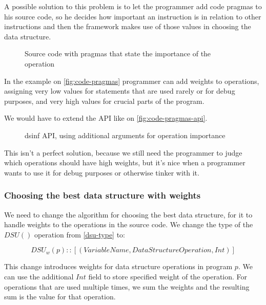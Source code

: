 \documentclass[a4paper,11pt]{article}
\begin{document}
			A possible solution to this problem is to let the programmer add code pragmas to his source
			code, so he decides how important an instruction is in relation to other instructions and then
			the framework makes use of those values in choosing the data structure.

            \begin{figure}[!h]
				

				\caption{Source code with pragmas that state the importance of the operation}

				\label{fig:code-pragmas}
			\end{figure}

            In the example on \autoref{fig:code-pragmas} programmer can add weights to operations, assigning very low values
			for statements that are used rarely or for debug purposes, and very high values for crucial
			parts of the program.

            We would have to extend the API like on \autoref{fig:code-pragmas-api}.

            \begin{figure}[!h]
				

				\caption{dsinf API, using additional arguments for operation importance}

				\label{fig:code-pragmas-api}
			\end{figure}

			This isn't a perfect solution, because we still need the programmer to judge which operations
			should have high weights, but it's nice when a programmer wants to use it for debug purposes or
			otherwise tinker with it.

		\subsubsection{Choosing the best data structure with weights} \label{sec:choose-weights}

			We need to change the algorithm for choosing the best data structure, for it to handle weights
			to the operations in the source code. We change the type of the $DSU()$ operation from
			\autoref{dsu-type} to:

			\begin{equation}
				DSU_w(p) :: [(VariableName, DataStructureOperation, Int)]
			\end{equation}

			This change introduces weights for data structure operations in program $\mathit{p}$. We can use the
			additional $\mathit{Int}$ field to store specified weight of the operation. For operations that are used
			multiple times, we sum the weights and the resulting sum is the value for that operation.
\end{document}

